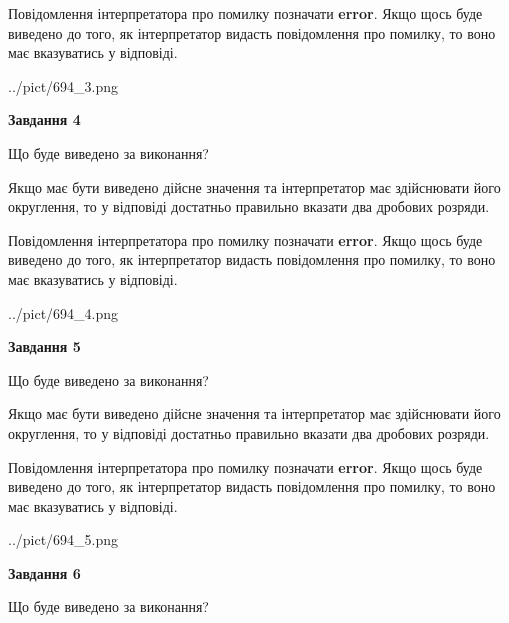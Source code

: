 \documentclass[12pt, ukrainian]{article}
\begin{document}
{\begin {Large}
Повідомлення інтерпретатора про помилку позначати \textbf{error}.
Якщо щось буде виведено до того, як інтерпретатор видасть повідомлення про помилку, 
то воно має вказуватись у відповіді. \par

\begin{center}
	{../pict/694_3.png}
\end{center}
\newpage

{\begin {center}\textbf{Завдання 4}\end {center}}\par
Що буде виведено за виконання? \par

Якщо має бути виведено дійсне значення та інтерпретатор має здійснювати його округлення, 
то у відповіді достатньо правильно вказати два дробових розряди.

Повідомлення інтерпретатора про помилку позначати \textbf{error}.
Якщо щось буде виведено до того, як інтерпретатор видасть повідомлення про помилку, 
то воно має вказуватись у відповіді. \par

\begin{center}
	{../pict/694_4.png}
\end{center}
\newpage

{\begin {center}\textbf{Завдання 5}\end {center}}\par
Що буде виведено за виконання? \par

Якщо має бути виведено дійсне значення та інтерпретатор має здійснювати його округлення, 
то у відповіді достатньо правильно вказати два дробових розряди.

Повідомлення інтерпретатора про помилку позначати \textbf{error}.
Якщо щось буде виведено до того, як інтерпретатор видасть повідомлення про помилку, 
то воно має вказуватись у відповіді. \par

\begin{center}
	{../pict/694_5.png}
\end{center}
\newpage

{\begin {center}\textbf{Завдання 6}\end {center}}\par
Що буде виведено за виконання? \par


\end{Large}}
\end{document}
